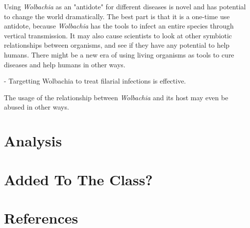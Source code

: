 \documentclass[twocolumn]{article}
\begin{document}
Using \textit{Wolbachia} as an "antidote" for different diseases is novel and has potential to change the world dramatically. The best part is that it is a one-time use antidote, because \textit{Wolbachia} has the tools to infect an entire species through vertical transmission. It may also cause scientists to look at other symbiotic relationships between organisms, and see if they have any potential to help humans. There might be a new era of using living organisms as tools to cure diseases and help humans in other ways.

- Targetting Wolbachia to treat filarial infections is effective.

The usage of the relationship between \textit{Wolbachia} and its host may even be abused in other ways. 

\section*{Analysis}

\section*{Added To The Class?}

\section*{References}

\printbibliography
\end{document}
